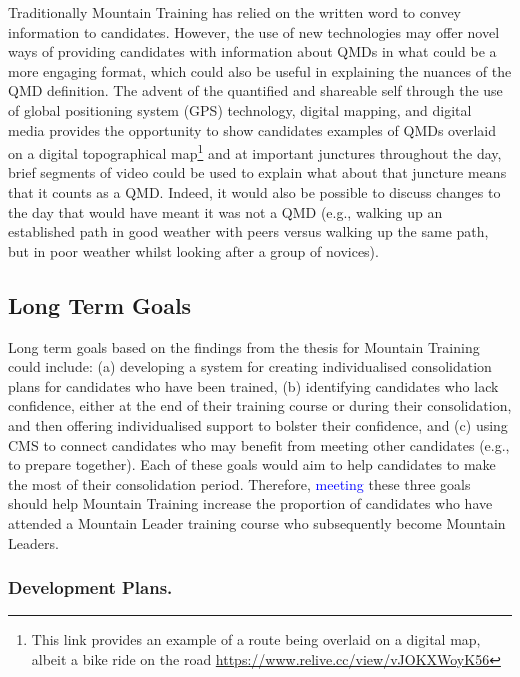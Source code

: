 \documentclass[
  12pt,
  a4paper,
]{book}
\begin{document}
Traditionally Mountain Training has relied on the written word to convey information to candidates. However, the use of new technologies may offer novel ways of providing candidates with information about QMDs in what could be a more engaging format, which could also be useful in explaining the nuances of the QMD definition. The advent of the quantified and shareable self through the use of global positioning system (GPS) technology, digital mapping, and digital media provides the opportunity to show candidates examples of QMDs overlaid on a digital topographical map\footnote{This link provides an example of a route being overlaid on a digital map, albeit a bike ride on the road \url{https://www.relive.cc/view/vJOKXWoyK56}} and at important junctures throughout the day, brief segments of video could be used to explain what about that juncture means that it counts as a QMD. Indeed, it would also be possible to discuss changes to the day that would have meant it was not a QMD (e.g., walking up an established path in good weather with peers versus walking up the same path, but in poor weather whilst looking after a group of novices).

\hypertarget{long-term-goals}{%
\subsection{Long Term Goals}\label{long-term-goals}}

Long term goals based on the findings from the thesis for Mountain Training could include: (a) developing a system for creating individualised consolidation plans for candidates who have been trained, (b) identifying candidates who lack confidence, either at the end of their training course or during their consolidation, and then offering individualised support to bolster their confidence, and (c) using CMS to connect candidates who may benefit from meeting other candidates (e.g., to prepare together). Each of these goals would aim to help candidates to make the most of their consolidation period. Therefore, \textcolor{blue}{meeting} these three goals should help Mountain Training increase the proportion of candidates who have attended a Mountain Leader training course who subsequently become Mountain Leaders.

\hypertarget{development-plans.}{%
\subsubsection{Development Plans.}\label{development-plans.}}
\end{document}
